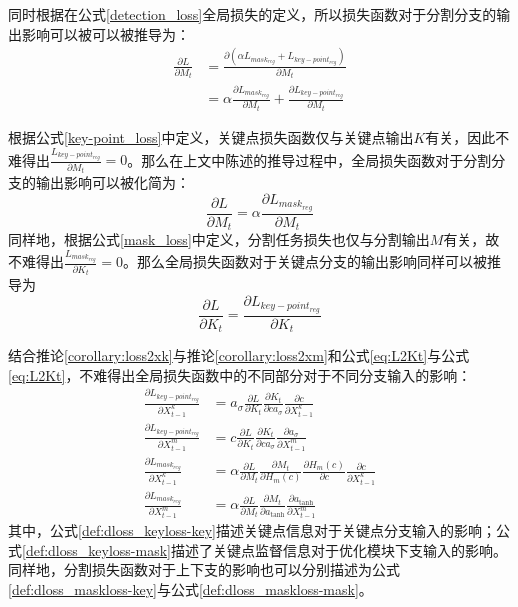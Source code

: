 同时根据在公式\eqref{detection_loss}全局损失的定义，所以损失函数对于分割分支的输出影响可以被可以被推导为：
\begin{equation*}
\begin{aligned}
\frac{\partial L}{\partial M_t} &= \frac{\partial (\alpha L_{mask_{reg}} + L_{key-point_{reg}})}{\partial M_t}\\
&= \alpha\frac{\partial L_{mask_{reg}}}{\partial M_t} + \frac{\partial L_{key-point_{reg}}}{\partial M_t}
\end{aligned}
\end{equation*}

根据公式\eqref{key-point_loss}中定义，关键点损失函数仅与关键点输出$K$有关，因此不难得出$\frac{L_{key-point_{reg}}}{\partial M_t}=0$。那么在上文中陈述的推导过程中，全局损失函数对于分割分支的输出影响可以被化简为：
\begin{equation}
\label{eq:L2Mt}
\frac{\partial L}{\partial M_t} = \alpha\frac{\partial L_{mask_{reg}}}{\partial M_t}
\end{equation}
同样地，根据公式\eqref{mask_loss}中定义，分割任务损失也仅与分割输出$M$有关，故不难得出$\frac{L_{mask_{reg}}}{\partial K_t}=0$。那么全局损失函数对于关键点分支的输出影响同样可以被推导为
\begin{equation}
\label{eq:L2Kt}
\frac{\partial L}{\partial K_t} = \frac{\partial L_{key-point_{reg}}}{\partial K_t}
\end{equation}

结合推论\ref{corollary:loss2xk}与推论\ref{corollary:loss2xm}和公式\eqref{eq:L2Kt}与公式\eqref{eq:L2Kt}，不难得出全局损失函数中的不同部分对于不同分支输入的影响：
\begin{align}
\frac{\partial L_{key-point_{reg}}}{\partial X^k_{t-1}} &= a_{\sigma}\frac{\partial L}{\partial K_t}\frac{\partial K_t}{\partial ca_{\sigma}}\frac{\partial c}{\partial X_{t-1}^k}\label{def:dloss_keyloss-key}\\
\frac{\partial L_{key-point_{reg}}}{\partial X^m_{t-1}} &= c\frac{\partial L}{\partial K_t}\frac{\partial K_t}{\partial ca_{\sigma}}\frac{\partial a_{\sigma}}{\partial X^m_{t-1}}\label{def:dloss_keyloss-mask}\\
\frac{\partial L_{mask_{reg}}}{\partial X^k_{t-1}} &= \alpha\frac{\partial L}{\partial M_t}\frac{\partial M_t}{\partial H_m(c)}\frac{\partial H_m(c)}{\partial c}\frac{\partial c}{\partial X_{t-1}^k}\label{def:dloss_maskloss-key}\\
\frac{\partial L_{mask_{reg}}}{\partial X^m_{t-1}} &= \alpha\frac{\partial L}{\partial M_t}\frac{\partial M_t}{\partial a_{\tanh}}\frac{\partial a_{\tanh}}{\partial X^m_{t-1}}\label{def:dloss_maskloss-mask}
\end{align}
其中，公式\eqref{def:dloss_keyloss-key}描述关键点信息对于关键点分支输入的影响；公式\eqref{def:dloss_keyloss-mask}描述了关键点监督信息对于优化模块下支输入的影响。同样地，分割损失函数对于上下支的影响也可以分别描述为公式\eqref{def:dloss_maskloss-key}与公式\eqref{def:dloss_maskloss-mask}。

